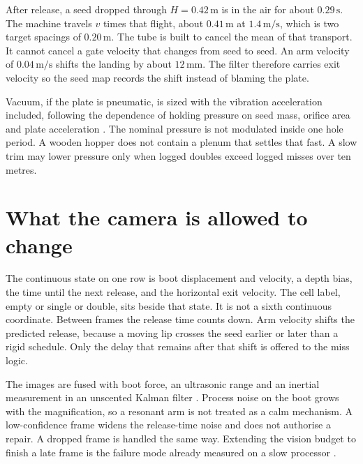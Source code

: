 \documentclass[11pt,a4paper]{article}
\begin{document}
After release, a seed dropped through \(H=0.42\,\mathrm{m}\) is in the air for about \(0.29\,\mathrm{s}\). The machine travels \(v\) times that flight, about \(0.41\,\mathrm{m}\) at \(1.4\,\mathrm{m/s}\), which is two target spacings of \(0.20\,\mathrm{m}\). The tube is built to cancel the mean of that transport. It cannot cancel a gate velocity that changes from seed to seed. An arm velocity of \(0.04\,\mathrm{m/s}\) shifts the landing by about \(12\,\mathrm{mm}\). The filter therefore carries exit velocity so the seed map records the shift instead of blaming the plate.

Vacuum, if the plate is pneumatic, is sized with the vibration acceleration included, following the dependence of holding pressure on seed mass, orifice area and plate acceleration \cite{karayel2004}. The nominal pressure is not modulated inside one hole period. A wooden hopper does not contain a plenum that settles that fast. A slow trim may lower pressure only when logged doubles exceed logged misses over ten metres.

\section{What the camera is allowed to change}
The continuous state on one row is boot displacement and velocity, a depth bias, the time until the next release, and the horizontal exit velocity. The cell label, empty or single or double, sits beside that state. It is not a sixth continuous coordinate. Between frames the release time counts down. Arm velocity shifts the predicted release, because a moving lip crosses the seed earlier or later than a rigid schedule. Only the delay that remains after that shift is offered to the miss logic.

The images are fused with boot force, an ultrasonic range and an inertial measurement in an unscented Kalman filter \cite{julier1997,sarkka2013}. Process noise on the boot grows with the magnification, so a resonant arm is not treated as a calm mechanism. A low-confidence frame widens the release-time noise and does not authorise a repair. A dropped frame is handled the same way. Extending the vision budget to finish a late frame is the failure mode already measured on a slow processor \cite{borja2021}.
\end{document}
